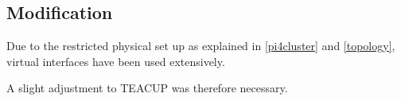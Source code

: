 \subsection{Modification}

Due to the restricted physical set up as explained in \ref{pi4cluster} and \ref{topology}, virtual interfaces have been used extensively. 

A slight adjustment to TEACUP was therefore necessary.


